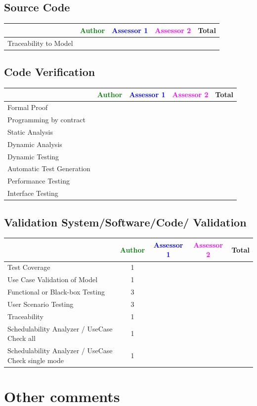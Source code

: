 \subsection{Source Code}


\begin{tabular}{|l | c | c | c | c|}
\hline
& \textcolor{green}{Author} & \textcolor{blue}{Assessor 1} & \textcolor{magenta}{Assessor 2} & Total \\
\hline 
Traceability to Model & & & &  \\
\hline
\end{tabular}


\subsection{Code Verification	}


\begin{tabular}{|l | c | c | c | c|}
\hline
& \textcolor{green}{Author} & \textcolor{blue}{Assessor 1} & \textcolor{magenta}{Assessor 2} & Total \\
\hline 
Formal Proof & & & &  \\
\hline
Programming by contract & & & &  \\
\hline
Static Analysis & & & &  \\
\hline
Dynamic Analysis & & & &  \\
\hline
Dynamic Testing & & & &  \\
\hline
Automatic Test Generation & & & &  \\
\hline
Performance Testing & & & &  \\
\hline
Interface Testing & & & &  \\
\hline
\end{tabular}

	
\subsection{Validation System/Software/Code/ Validation	}


\begin{tabular}{|l | c | c | c | c|}
\hline
& \textcolor{green}{Author} & \textcolor{blue}{Assessor 1} & \textcolor{magenta}{Assessor 2} & Total \\
\hline 
Test Coverage &1 & & &  \\
\hline
Use Case Validation of Model &1 & & &  \\
\hline
Functional or Black-box Testing &3 & & &  \\
\hline
User Scenario Testing &3 & & &  \\
\hline
Traceability &1 & & &  \\
\hline
Schedulability Analyzer / UseCase Check all &1 & & &  \\
\hline
Schedulability Analyzer / UseCase Check single mode &1 & & &  \\
\hline

\end{tabular}



\section{Other comments}


